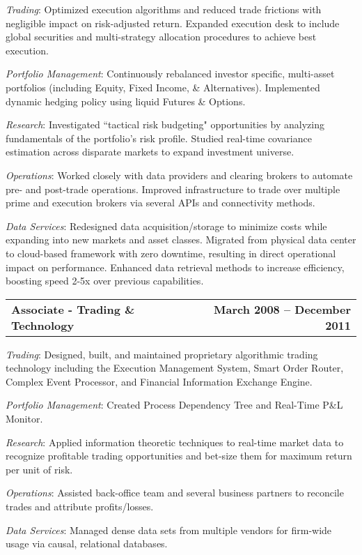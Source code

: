 \documentclass[12pt]{article}
\begin{document}
    \begin{list}{}{\leftmargin=1em}
      \item \textit{Trading}: Optimized execution algorithms and reduced trade
        frictions with negligible impact on risk-adjusted return. Expanded execution
        desk to include global securities and multi-strategy allocation procedures
        to achieve best execution.
      \item \textit{Portfolio Management}: Continuously rebalanced
        investor specific, multi-asset portfolios (including Equity, Fixed Income,
        \& Alternatives). Implemented dynamic hedging policy using liquid Futures \& Options.
      \item \textit{Research}: Investigated ``tactical risk budgeting" opportunities
        by analyzing fundamentals of the portfolio's risk profile. Studied real-time
        covariance estimation across disparate markets to expand investment universe. 
      \item \textit{Operations}: Worked closely with data providers and clearing
        brokers to automate pre- and post-trade operations. Improved infrastructure
        to trade over multiple prime and execution brokers via several APIs and
        connectivity methods. 
      \item \textit{Data Services}: Redesigned data acquisition/storage to
        minimize costs while expanding into new markets and asset classes. Migrated
        from physical data center to cloud-based framework with zero downtime,
        resulting in direct operational impact on performance. Enhanced data
        retrieval methods to increase efficiency, boosting speed 2-5x over
        previous capabilities.
    \end{list}
  \begin{tabular*}{7.5in}{@{\extracolsep{\fill}}lr}
    \textbf{Associate - Trading \& Technology} & \textbf{March 2008 -- December 2011}
  \end{tabular*}
    \begin{list}{}{\leftmargin=1em}
      \item \textit{Trading}: Designed, built, and maintained proprietary algorithmic
        trading technology including the Execution Management System, Smart Order
        Router, Complex Event Processor, and Financial Information Exchange Engine.
      \item \textit{Portfolio Management}: Created Process Dependency Tree and
        Real-Time P\&L Monitor.
      \item \textit{Research}: Applied information theoretic techniques to real-time
        market data to recognize profitable trading opportunities and bet-size them
        for maximum return per unit of risk.
      \item \textit{Operations}: Assisted back-office team and several
        business partners to reconcile trades and attribute profits/losses.
      \item \textit{Data Services}: Managed dense data sets from multiple vendors
        for firm-wide usage via causal, relational databases.
    \end{list}
\end{document}
